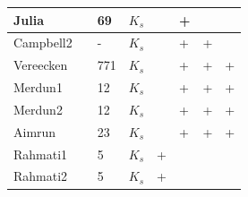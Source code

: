 \begin{landscape}
\begin{ThreePartTable}
\begin{center}
\begin{longtable}{p{2cm}<{\centering}p{4cm}<{\centering}p{2cm}<{\centering}p{2.8cm}<{\centering}p{2cm}<{\centering}p{2cm}<{\centering}p{2cm}<{\centering}p{2cm}<{\centering}}
Julia& \citet{Julia_2004} &	69&	$K_s$&	&	+&	&	\\\hline
Campbell2& \citet{Campbell_1985}&	-&	$K_s$&	&	+&	+&	\\\hline
Vereecken& \citet{Vereecken_Maes_1990} &	771&	$K_s$&	&	+&	+&	+\\\hline
Merdun1& \citet{Merdun_2010} &	12&	$K_s$&	&	+&	+&	+\\\hline
Merdun2& \citet{Merdun_2010} &	12&	$K_s$&	&	+&	+&	+\\\hline
Aimrun&	\citet{Aimrun_2009} &	23&	$K_s$&	&	+&	+&	+\\\hline
Rahmati1& \citet{Rahmati_2018} &	5&	$K_s$&	+&	&	&	\\\hline
Rahmati2& \citet{Rahmati_2018} &	5&	$K_s$&	+&	&	&	\\
\end{longtable}
\end{center}
\end{ThreePartTable}
\end{landscape}






